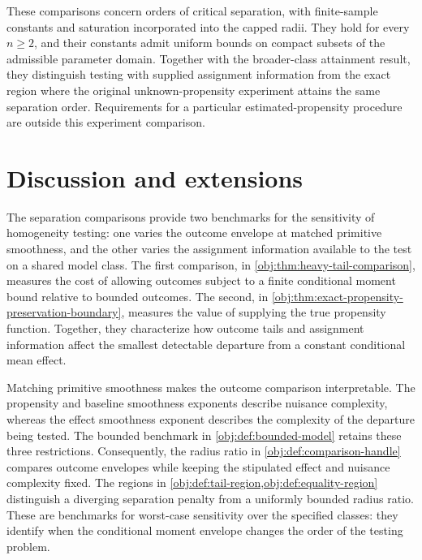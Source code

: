 \documentclass[11pt]{article}
\begin{document}
These comparisons concern orders of critical separation, with finite-sample constants and saturation incorporated into the capped radii. They hold for every \(n\ge2\), and their constants admit uniform bounds on compact subsets of the admissible parameter domain. Together with the broader-class attainment result, they distinguish testing with supplied assignment information from the exact region where the original unknown-propensity experiment attains the same separation order. Requirements for a particular estimated-propensity procedure are outside this experiment comparison.


\section{Discussion and extensions}

The separation comparisons provide two benchmarks for the sensitivity of homogeneity testing: one varies the outcome envelope at matched primitive smoothness, and the other varies the assignment information available to the test on a shared model class. The first comparison, in \cref{obj:thm:heavy-tail-comparison}, measures the cost of allowing outcomes subject to a finite conditional moment bound relative to bounded outcomes. The second, in \cref{obj:thm:exact-propensity-preservation-boundary}, measures the value of supplying the true propensity function. Together, they characterize how outcome tails and assignment information affect the smallest detectable departure from a constant conditional mean effect.

Matching primitive smoothness makes the outcome comparison interpretable. The propensity and baseline smoothness exponents describe nuisance complexity, whereas the effect smoothness exponent describes the complexity of the departure being tested. The bounded benchmark in \cref{obj:def:bounded-model} retains these three restrictions. Consequently, the radius ratio in \cref{obj:def:comparison-handle} compares outcome envelopes while keeping the stipulated effect and nuisance complexity fixed. The regions in \cref{obj:def:tail-region,obj:def:equality-region} distinguish a diverging separation penalty from a uniformly bounded radius ratio. These are benchmarks for worst-case sensitivity over the specified classes: they identify when the conditional moment envelope changes the order of the testing problem.
\end{document}
